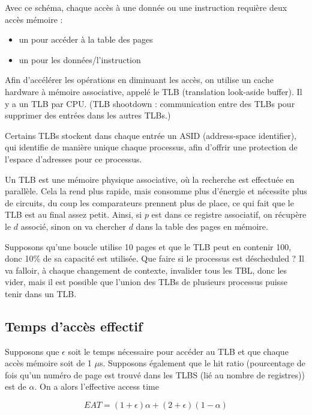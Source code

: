 	Avec ce schéma, chaque accès à une donnée ou une instruction requière deux accès mémoire :
	
	\begin{itemize}
		\item un pour accéder à la table des pages
		\item un pour les données/l'instruction
	\end{itemize}
	
	Afin d'accélérer les opérations en diminuant les accès, on utilise un cache hardware à mémoire associative, appelé le TLB (translation look-aside buffer). Il y a un TLB par CPU. (TLB shootdown : communication entre des TLBs pour supprimer des entrées dans les autres TLBs.)
	
	Certains TLBs stockent dans chaque entrée un ASID (address-space identifier), qui identifie de manière unique chaque processus, afin d'offrir une protection de l'espace d'adresses pour ce processus.
	
	Un TLB est une mémoire physique associative, où la recherche est effectuée en parallèle. Cela la rend plus rapide, mais consomme plus d'énergie et nécessite plus de circuits, du coup les comparateurs prennent plus de place, ce qui fait que le TLB est au final assez petit. Ainsi, si $p$ est dans ce registre associatif, on récupère le $d$ associé, sinon on va chercher $d$ dans la table des pages en mémoire.
	
	
	Supposons qu'une boucle utilise 10 pages et que le TLB peut en contenir 100, donc 10\% de sa capacité est utilisée. Que faire si le processus est déscheduled ? Il va falloir, à chaque changement de contexte, invalider tous les TBL, donc les vider, mais il est possible que l'union des TLBs de plusieurs processus puisse tenir dans un TLB.
	
	
	\subsection{Temps d'accès effectif}
	
	Supposons que $\epsilon$ soit le temps nécessaire pour accéder au TLB et que chaque accès mémoire soit de 1 $\mu$s. Supposons également que le hit ratio (pourcentage de fois qu'un numéro de page est trouvé dans les TLBS (lié au nombre de registres)) est de $\alpha$. On a alors l'effective access time
	
	$$EAT = (1 + \epsilon) \alpha + (2 + \epsilon) (1 - \alpha)$$
	
